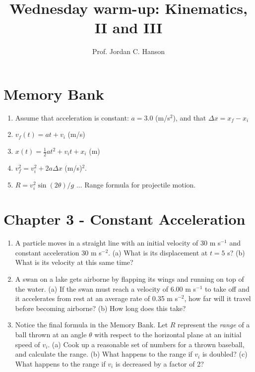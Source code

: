 \documentclass{article}
\begin{document}
\twocolumn

\title{Wednesday warm-up: Kinematics, II and III}
\author{Prof. Jordan C. Hanson}

\maketitle

\section{Memory Bank}

\begin{enumerate}
\item Assume that acceleration is constant: $a = 3.0$ (m/s$^2$), and that $\Delta x = x_f - x_i$
\item $v_f(t) = at + v_{i}$ (m/s)
\item $x(t) = \frac{1}{2}at^2 + v_{i} t + x_{i}$ (m)
\item $v_f^2 = v_i^2 + 2a\Delta x$ (m/s)$^2$.
\item $R = v_i^2 \sin(2\theta)/g$ ... Range formula for projectile motion.
\end{enumerate}

\section{Chapter 3 - Constant Acceleration}

\begin{enumerate}
\item A particle moves in a straight line with an initial velocity of 30 m s$^{-1}$ and constant acceleration 30 m s$^{-2}$. (a) What is its displacement at $t = 5$ s? (b) What is its velocity at this same time? \\ \vspace{3cm}
\item A swan on a lake gets airborne by flapping its wings and running on top of the water. (a) If the swan must reach a velocity of 6.00 m s$^{-1}$ to take off and it accelerates from rest at an average rate of 0.35 m s$^{-2}$, how far will it travel before becoming airborne? (b) How long does this take? \\ \vspace{3cm}
\item Notice the final formula in the Memory Bank.  Let $R$ represent the \textit{range} of a ball thrown at an angle $\theta$ with respect to the horizontal plane at an initial speed of $v_i$.  (a) Cook up a reasonable set of numbers for a thrown baseball, and calculate the range. (b) What happens to the range if $v_i$ is doubled?  (c) What happens to the range if $v_i$ is decreased by a factor of 2?
\end{enumerate}
\end{document}
